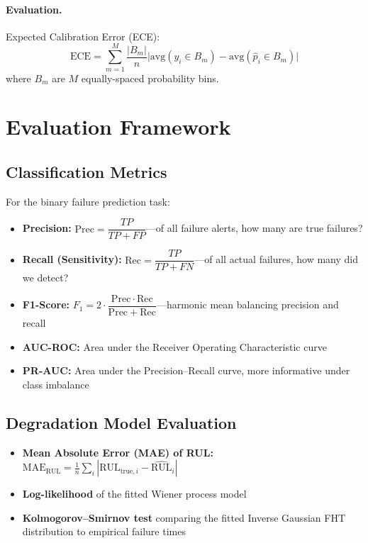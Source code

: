 \documentclass[12pt, a4paper]{article}
\newcommand{\RUL}{\mathrm{RUL}}
\begin{document}
\paragraph{Evaluation.} Expected Calibration Error (ECE):
\begin{equation}\label{eq:ece}
    \mathrm{ECE} = \sum_{m=1}^{M}\frac{|B_m|}{n}\bigl|\mathrm{avg}(y_i \in B_m) - \mathrm{avg}(\hat{p}_i \in B_m)\bigr|
\end{equation}
where $B_m$ are $M$ equally-spaced probability bins.


\section{Evaluation Framework}

\subsection{Classification Metrics}

For the binary failure prediction task:

\begin{itemize}[leftmargin=*]
    \item \textbf{Precision:} $\mathrm{Prec} = \dfrac{TP}{TP + FP}$\quad---\quad of all failure alerts, how many are true failures?
    \item \textbf{Recall (Sensitivity):} $\mathrm{Rec} = \dfrac{TP}{TP + FN}$\quad---\quad of all actual failures, how many did we detect?
    \item \textbf{F1-Score:} $F_1 = 2\cdot\dfrac{\mathrm{Prec}\cdot\mathrm{Rec}}{\mathrm{Prec}+\mathrm{Rec}}$\quad---\quad harmonic mean balancing precision and recall
    \item \textbf{AUC-ROC:} Area under the Receiver Operating Characteristic curve
    \item \textbf{PR-AUC:} Area under the Precision--Recall curve, more informative under class imbalance
\end{itemize}

\subsection{Degradation Model Evaluation}

\begin{itemize}[leftmargin=*]
    \item \textbf{Mean Absolute Error (MAE) of RUL:}\quad $\mathrm{MAE}_{\RUL} = \frac{1}{n}\sum_i|\RUL_{\mathrm{true},i} - \widehat{\RUL}_i|$
    \item \textbf{Log-likelihood} of the fitted Wiener process model
    \item \textbf{Kolmogorov--Smirnov test} comparing the fitted Inverse Gaussian FHT distribution to empirical failure times
\end{itemize}
\end{document}
